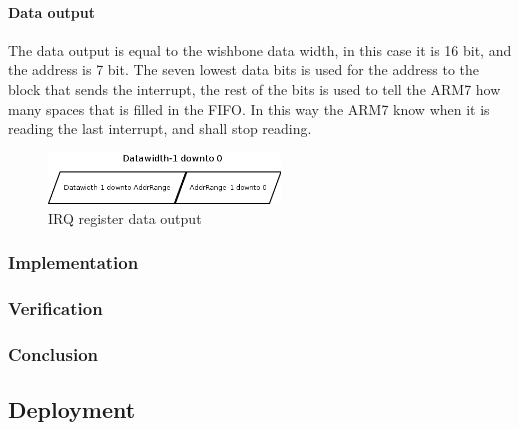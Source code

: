 \paragraph{Data output}
The data output is equal to the wishbone data width, in this case it is 16 bit, and the address is 7 bit. The seven lowest data bits is used for the address to the block that sends the interrupt, the rest of the bits is used to tell the ARM7 how many spaces that is filled in the FIFO. In this way the ARM7 know when it is reading the last interrupt, and shall stop reading.
\begin{figure}[H]
	\begin{centering}
		\includegraphics[width=0.55\textwidth]{images/tb5_irq_reg_data_o.png}
		\caption{IRQ register data output}
	\end{centering}
\end{figure}
%
%
\subsubsection{Implementation}
%
%
\subsubsection{Verification}
%
\subsubsection{Conclusion}



\subsection{Deployment}
